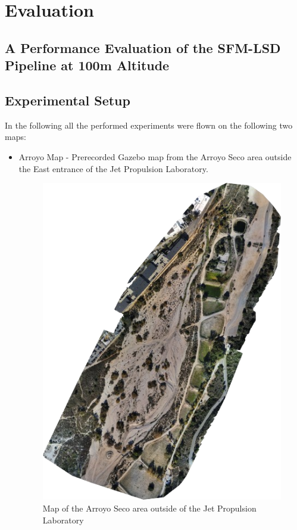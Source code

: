 \chapter{Evaluation}
\label{chapter:evaluation}

\section{A Performance Evaluation of the SFM-LSD Pipeline at 100m Altitude}
\section{Experimental Setup}
In the following all the performed experiments were flown on the following two maps:
\begin{itemize}
    \item Arroyo Map - Prerecorded Gazebo map from the Arroyo Seco area outside the East entrance of the Jet Propulsion Laboratory.
    \begin{figure}
        \centering
        \includegraphics[scale=0.5]{images/evaluation/arroyo.png}
        \caption{Map of the Arroyo Seco area outside of the Jet Propulsion Laboratory}
    \end{figure}

\end{itemize}
